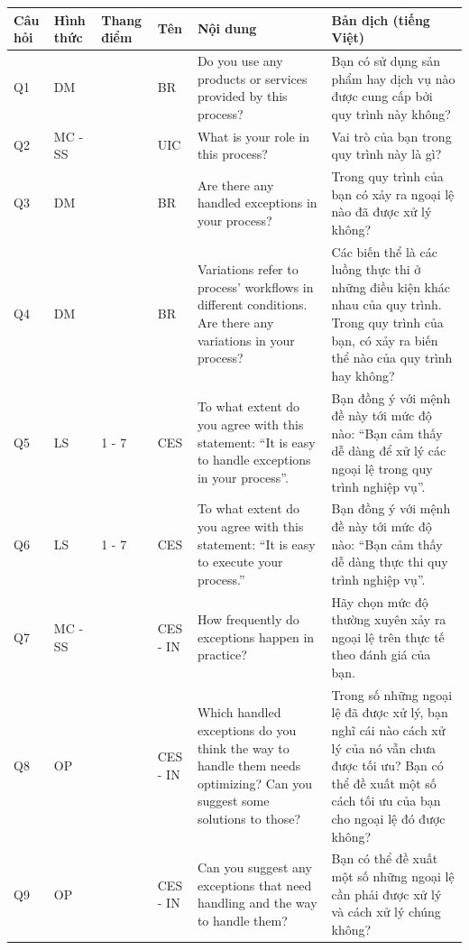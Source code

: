 \begin{center}
    \begin{tabular}{|p{0.8cm} |p{1.5cm} |p{1cm}| p{0.8cm} | p{5cm} | p{5cm} |}
        \hline
            Câu hỏi  & Hình thức & Thang điểm & Tên & Nội dung & Bản dịch (tiếng Việt)\\ [0.5ex] 
        \hline
            Q1 & DM &  & BR & Do you use any products or services provided by this process? & Bạn có sử dụng sản phẩm hay dịch vụ nào được cung cấp bởi quy trình này không? \\
        \hline
            Q2 & MC - SS &  & UIC & What is your role in this process? & Vai trò của bạn trong quy trình này là gì? \\ 
        \hline
            Q3 & DM &  & BR & Are there any handled exceptions in your process? & Trong quy trình của bạn có xảy ra ngoại lệ nào đã được xử lý không? \\
        \hline
            Q4 & DM & & BR & Variations refer to process’ workflows in different conditions. Are there any variations in your process? & Các biến thể là các luồng thực thi ở những điều kiện khác nhau của quy trình. Trong quy trình của bạn, có xảy ra biến thể nào của quy trình hay không? \\
        \hline
            Q5 & LS & 1 - 7 & CES & To what extent do you agree with this statement: “It is easy to handle exceptions in your process”. & Bạn đồng ý với mệnh đề này tới mức độ nào: “Bạn cảm thấy dễ dàng để xử lý các ngoại lệ trong quy trình nghiệp vụ”. \\
        \hline
            Q6 & LS & 1 - 7 & CES & To what extent do you agree with this statement: “It is easy to execute your process.” & Bạn đồng ý với mệnh đề này tới mức độ nào: “Bạn cảm thấy dễ dàng thực thi quy trình nghiệp vụ”. \\
        \hline
            Q7 & MC - SS &  & CES - IN & How frequently do exceptions happen in practice? & Hãy chọn mức độ thường xuyên xảy ra ngoại lệ trên thực tế theo đánh giá của bạn. \\
        \hline
            Q8 & OP & & CES - IN & Which handled exceptions do you think the way to handle them needs optimizing? Can you suggest some solutions to those? & Trong số những ngoại lệ đã được xử lý, bạn nghĩ cái nào cách xử lý của nó vẫn chưa được tối ưu? Bạn có thể đề xuất một số cách tối ưu của bạn cho ngoại lệ đó được không? \\
        \hline
            Q9 & OP & & CES - IN & Can you suggest any exceptions that need handling and the way to handle them? & Bạn có thể đề xuất một số những ngoại lệ cần phải được xử lý và cách xử lý chúng không? \\ [1ex]
        \hline
    \end{tabular}
\end{center}

